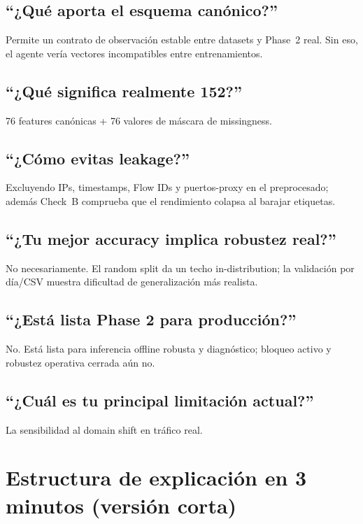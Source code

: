 ﻿\documentclass[12pt,a4paper]{article}
\begin{document}
\subsection{``¿Qué aporta el esquema canónico?''}

Permite un contrato de observación estable entre datasets y Phase~2 real. Sin eso, el agente vería
vectores incompatibles entre entrenamientos.

\subsection{``¿Qué significa realmente 152?''}

76 features canónicas + 76 valores de máscara de missingness.

\subsection{``¿Cómo evitas leakage?''}

Excluyendo IPs, timestamps, Flow IDs y puertos-proxy en el preprocesado; además Check~B comprueba
que el rendimiento colapsa al barajar etiquetas.

\subsection{``¿Tu mejor accuracy implica robustez real?''}

No necesariamente. El random split da un techo in-distribution; la validación por día/CSV muestra
dificultad de generalización más realista.

\subsection{``¿Está lista Phase 2 para producción?''}

No. Está lista para inferencia offline robusta y diagnóstico; bloqueo activo y robustez operativa
cerrada aún no.

\subsection{``¿Cuál es tu principal limitación actual?''}

La sensibilidad al domain shift en tráfico real.

\section{Estructura de explicación en 3 minutos (versión corta)}
\end{document}
